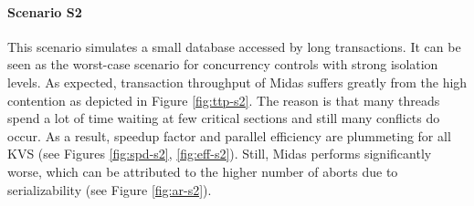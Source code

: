 \paragraph{Scenario S2}

This scenario simulates a small database accessed by long transactions. It can
be seen as the worst-case scenario for concurrency controls with strong
isolation levels. As expected, transaction throughput of Midas suffers greatly
from the high contention as depicted in Figure \ref{fig:ttp-s2}. The reason is
that many threads spend a lot of time waiting at few critical sections and still
many conflicts do occur. As a result, speedup factor and parallel efficiency are
plummeting for all KVS (see Figures \ref{fig:spd-s2}, \ref{fig:eff-s2}). Still,
Midas performs significantly worse, which can be attributed to the higher number
of aborts due to serializability (see Figure \ref{fig:ar-s2}).

